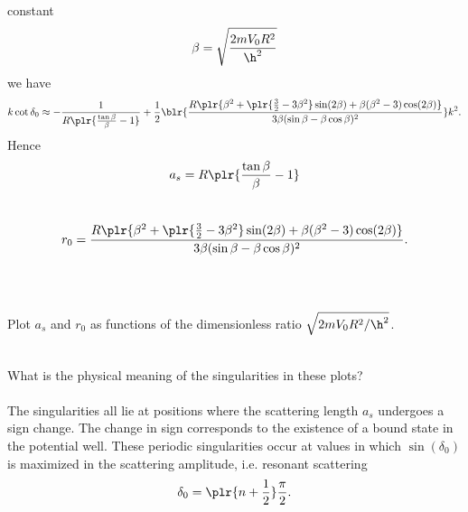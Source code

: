 \documentclass[10pt,letterpaper]{article}
\begin{document}
	constant
	\[
		\beta= \sqrt{\frac{2mV_0R^2}{\h^2}}
	\]
	we have
	\[
		k\cot\delta_0 \approx -\frac{1}{R\plr{\frac{\tan\beta}{\beta}-1}}+\frac{1}{2}
		\blr{\frac{R\plr{\beta^2+\plr{\frac{3}{2}-3\beta^2}\sin(2\beta)+\beta(\beta^2-3)\cos(2\beta)}}
		{3\beta(\sin\beta-\beta\cos\beta)^2}}k^2.
	\]
	Hence
	\[
		a_s = R\plr{\frac{\tan\beta}{\beta}-1}
	\]
	\\
	\[
		r_0 = \frac{R\plr{\beta^2+\plr{\frac{3}{2}-3\beta^2}\sin(2\beta)+\beta(\beta^2-3)\cos(2\beta)}}
		{3\beta(\sin\beta-\beta\cos\beta)^2}.
	\]
	\\
	\\	
	\item
	Plot $a_s$ and $r_0$ as functions of the dimensionless ratio $\sqrt{2mV_0R^2/\h^2}$.
	\\
	\\
	\phantom{}
	\item 
	What is the physical meaning of the singularities in these plots?
	\\
	\\
	The singularities all lie at positions where the scattering length $a_s$ undergoes a sign change. The change in sign 		corresponds to the existence of a bound state in the potential well. These periodic singularities occur at values
	in which $\sin(\delta_0)$ is maximized in the scattering amplitude, i.e. resonant scattering
	\[
		\delta_0 = \plr{n+\frac{1}{2}}\frac{\pi}{2}.
	\]
	\phantom{}
	\\
	\\
	\\
	\phantom{}
\eenum
	
\end{document}
